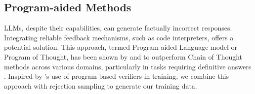 \subsection{Program-aided Methods}
LLMs, despite their capabilities, can generate factually incorrect responses. Integrating reliable feedback mechanisms, such as code interpreters, offers a potential solution. This approach, termed Program-aided Language model or Program of Thought, has been shown by \citet{gao2023palprogramaidedlanguagemodels} and \citet{chen2023programthoughtspromptingdisentangling} to outperform Chain of Thought methods across various domains, particularly in tasks requiring definitive answers \cite{wang2024mintevaluatingllmsmultiturn, wang2024letilearninggeneratetextual, lu2023chameleonplugandplaycompositionalreasoning}. Inspired by \cite{dong2024selfplayexecutionfeedbackimproving}'s use of program-based verifiers in training, we combine this approach with rejection sampling to generate our training data.